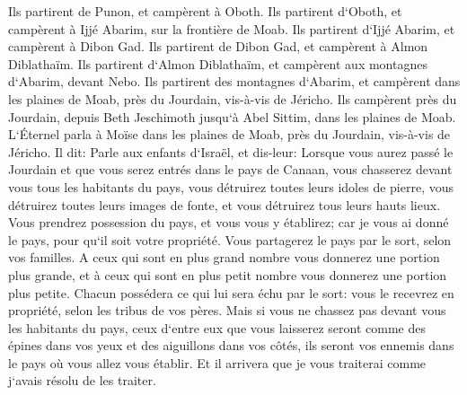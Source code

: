 \verse Ils partirent de Punon, et campèrent à Oboth. 
\verse Ils partirent d`Oboth, et campèrent à Ijjé Abarim, sur la frontière de Moab. 
\verse Ils partirent d`Ijjé Abarim, et campèrent à Dibon Gad. 
\verse Ils partirent de Dibon Gad, et campèrent à Almon Diblathaïm. 
\verse Ils partirent d`Almon Diblathaïm, et campèrent aux montagnes d`Abarim, devant Nebo. 
\verse Ils partirent des montagnes d`Abarim, et campèrent dans les plaines de Moab, près du Jourdain, vis-à-vis de Jéricho. 
\verse Ils campèrent près du Jourdain, depuis Beth Jeschimoth jusqu`à Abel Sittim, dans les plaines de Moab. 
\verse L`Éternel parla à Moïse dans les plaines de Moab, près du Jourdain, vis-à-vis de Jéricho. Il dit: 
\verse Parle aux enfants d`Israël, et dis-leur: Lorsque vous aurez passé le Jourdain et que vous serez entrés dans le pays de Canaan, 
\verse vous chasserez devant vous tous les habitants du pays, vous détruirez toutes leurs idoles de pierre, vous détruirez toutes leurs images de fonte, et vous détruirez tous leurs hauts lieux. 
\verse Vous prendrez possession du pays, et vous vous y établirez; car je vous ai donné le pays, pour qu`il soit votre propriété. 
\verse Vous partagerez le pays par le sort, selon vos familles. A ceux qui sont en plus grand nombre vous donnerez une portion plus grande, et à ceux qui sont en plus petit nombre vous donnerez une portion plus petite. Chacun possédera ce qui lui sera échu par le sort: vous le recevrez en propriété, selon les tribus de vos pères. 
\verse Mais si vous ne chassez pas devant vous les habitants du pays, ceux d`entre eux que vous laisserez seront comme des épines dans vos yeux et des aiguillons dans vos côtés, ils seront vos ennemis dans le pays où vous allez vous établir. 
\verse Et il arrivera que je vous traiterai comme j`avais résolu de les traiter. 

